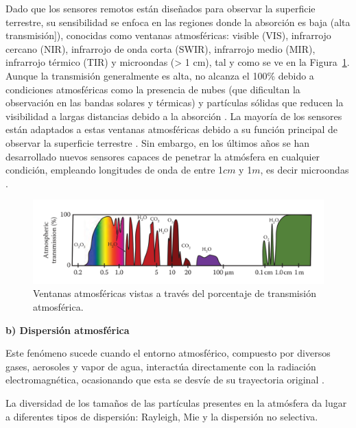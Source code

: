 Dado que los sensores remotos están diseñados para observar la superficie terrestre, su sensibilidad se enfoca en las regiones donde la absorción es baja (alta transmisión]), conocidas como ventanas atmosféricas: visible (VIS), infrarrojo cercano (NIR), infrarrojo de onda corta (SWIR), infrarrojo medio (MIR), infrarrojo térmico (TIR) y microondas (> 1 cm), tal y como se ve en la Figura~\ref{fig:VentanasAtmosféricas}. Aunque la transmisión generalmente es alta, no alcanza el 100\% debido a condiciones atmosféricas como la presencia de nubes (que dificultan la observación en las bandas solares y térmicas) y partículas sólidas que reducen la visibilidad a largas distancias debido a la absorción \cite{emery2017introduction}. La mayoría de los sensores están adaptados a estas ventanas atmosféricas debido a su función principal de observar la superficie terrestre \cite{canada2007fundamentals,chuvieco2016fundamentals}. Sin embargo, en los últimos años se han desarrollado nuevos sensores capaces de penetrar la atmósfera en cualquier condición, empleando longitudes de onda de entre 1$cm$ y 1$m$, es decir microondas \cite{emery2017introduction}.

\begin{figure}[H]
    \begin{center}
        \includegraphics[width=1\textwidth]{Images/VentanasAtmosfericas.png}
    \end{center}
    \caption{Ventanas atmosféricas vistas a través del porcentaje de transmisión atmosférica.}
    \label{fig:VentanasAtmosféricas}
\end{figure}

\textbf{b) Dispersión atmosférica}

Este fenómeno sucede cuando el entorno atmosférico, compuesto por diversos gases, aerosoles y vapor de agua, interactúa directamente con la radiación electromagnética, ocasionando que esta se desvíe de su trayectoria original \cite{canada2007fundamentals}.

La diversidad de los tamaños de las partículas presentes en la atmósfera da lugar a diferentes tipos de dispersión: Rayleigh, Mie y la dispersión no selectiva.

